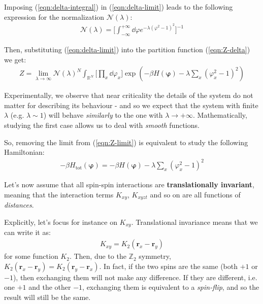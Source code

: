 \documentclass[../../main.tex]{subfiles}
\begin{document}
Imposing (\ref{eqn:delta-integral}) in (\ref{eqn:delta-limit}) leads to the following expression for the normalization $\mathcal{N}(\lambda)$:
\begin{align*}
    \mathcal{N}(\lambda) = \Big[\int_{-\infty}^{+\infty} \dd{\varphi} e^{-\lambda (\varphi^2-1)^2}\Big]^{-1}
\end{align*}

Then, substituting (\ref{eqn:delta-limit}) into the partition function (\ref{eqn:Z-delta}) we get:
\begin{align} \label{eqn:Z-limit}
    Z = \lim_{\lambda \to \infty} \mathcal{N}(\lambda)^N \int_{\mathbb{R}^N} \Big[\prod_x \dd{\varphi_x} \Big] \exp\left(-\beta H (\bm{\varphi}) - \lambda\sum_x (\varphi_x^2-1)^2 \right)
\end{align}

Experimentally, we observe that near criticality the details of the system do not matter for describing its behaviour - and so we expect that the system with finite $\lambda$ (e.g. $\lambda \sim 1$) will behave \textit{similarly} to the one with $\lambda \to +\infty$. Mathematically, studying the first case allows us to deal with \textit{smooth} functions.

\medskip

So, removing the limit from (\ref{eqn:Z-limit}) is equivalent to study the following Hamiltonian:
\begin{align*}
    -\beta H_{\mathrm{tot}}(\bm{\varphi}) = -\beta H(\bm{\varphi}) - \lambda\sum_x (\varphi_x^2 -1)^2 
\end{align*}

Let's now assume that all spin-spin interactions are \textbf{translationally invariant}, meaning that the interaction terms $K_{xy}$, $K_{xyzt}$ and so on are all functions of \textit{distances}.

\medskip

Explicitly, let's focus for instance on $K_{xy}$. Translational invariance means that we can write it as:
\begin{align*}
    K_{xy} = K_2(\bm{r}_x - \bm{r}_y)
\end{align*}
for some function $K_2$. Then, due to the $\mathbb{Z}_2$ symmetry, $K_2(\bm{r}_x - \bm{r}_y) = K_2(\bm{r}_y - \bm{r}_x)$. In fact, if the two spins are the same (both $+1$ or $-1$), then exchanging them will not make any difference. If they are different, i.e. one $+1$ and the other $-1$, exchanging them is equivalent to a \textit{spin-flip}, and so the result will still be the same. 
\end{document}
